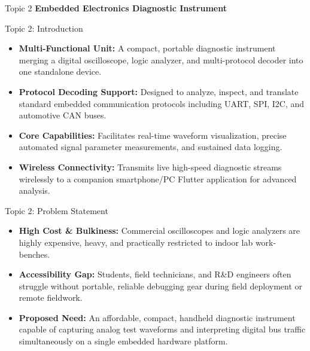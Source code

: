 \documentclass{beamer}
\begin{document}
\begin{frame}
  \begin{block}{\centering \huge Topic 2}
    \vspace{0.3cm}
    \centering \Large \textbf{Embedded Electronics Diagnostic Instrument}
    \vspace{0.3cm}
  \end{block}
\end{frame}

\begin{frame}{Topic 2: Introduction}
\begin{itemize}
  \item \textbf{Multi-Functional Unit:} A compact, portable diagnostic instrument merging a digital oscilloscope, logic analyzer, and multi-protocol decoder into one standalone device.
  \vspace{0.25cm}
  \item \textbf{Protocol Decoding Support:} Designed to analyze, inspect, and translate standard embedded communication protocols including UART, SPI, I2C, and automotive CAN buses.
  \vspace{0.25cm}
  \item \textbf{Core Capabilities:} Facilitates real-time waveform visualization, precise automated signal parameter measurements, and sustained data logging.
  \vspace{0.25cm}
  \item \textbf{Wireless Connectivity:} Transmits live high-speed diagnostic streams wirelessly to a companion smartphone/PC Flutter application for advanced analysis.
\end{itemize}
\end{frame}

\begin{frame}{Topic 2: Problem Statement}
\begin{itemize}
  \item \textbf{High Cost \& Bulkiness:} Commercial oscilloscopes and logic analyzers are highly expensive, heavy, and practically restricted to indoor lab work-benches.
  \vspace{0.35cm}
  \item \textbf{Accessibility Gap:} Students, field technicians, and R\&D engineers often struggle without portable, reliable debugging gear during field deployment or remote fieldwork.
  \vspace{0.35cm}
  \item \textbf{Proposed Need:} An affordable, compact, handheld diagnostic instrument capable of capturing analog test waveforms and interpreting digital bus traffic simultaneously on a single embedded hardware platform.
\end{itemize}
\end{frame}
\end{document}
